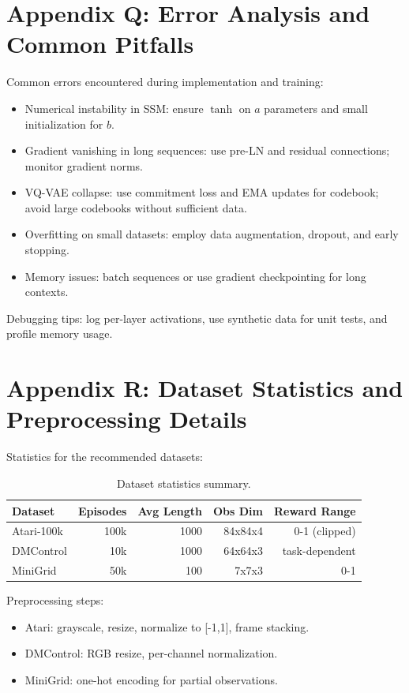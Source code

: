 \documentclass{article}
\begin{document}
\section{Appendix Q: Error Analysis and Common Pitfalls}
Common errors encountered during implementation and training:
\begin{itemize}
  \item Numerical instability in SSM: ensure $\tanh$ on $a$ parameters and small initialization for $b$.
  \item Gradient vanishing in long sequences: use pre-LN and residual connections; monitor gradient norms.
  \item VQ-VAE collapse: use commitment loss and EMA updates for codebook; avoid large codebooks without sufficient data.
  \item Overfitting on small datasets: employ data augmentation, dropout, and early stopping.
  \item Memory issues: batch sequences or use gradient checkpointing for long contexts.
\end{itemize}
Debugging tips: log per-layer activations, use synthetic data for unit tests, and profile memory usage.

\section{Appendix R: Dataset Statistics and Preprocessing Details}
Statistics for the recommended datasets:
\begin{table}[h]
\centering
\begin{tabular}{lrrrr}
\toprule
Dataset & Episodes & Avg Length & Obs Dim & Reward Range \\\midrule
Atari-100k & 100k & 1000 & 84x84x4 & 0-1 (clipped) \\
DMControl & 10k & 1000 & 64x64x3 & task-dependent \\
MiniGrid & 50k & 100 & 7x7x3 & 0-1 \\
\bottomrule
\end{tabular}
\caption{Dataset statistics summary.}
\end{table}

Preprocessing steps:
\begin{itemize}
  \item Atari: grayscale, resize, normalize to [-1,1], frame stacking.
  \item DMControl: RGB resize, per-channel normalization.
  \item MiniGrid: one-hot encoding for partial observations.
\end{itemize}
\end{document}
